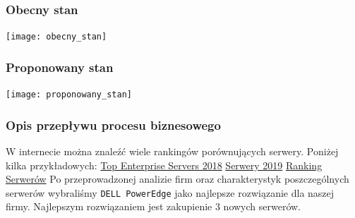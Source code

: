 \documentclass[a4paper, 12pt]{article}
\begin{document}
				\subsubsection{Obecny stan}
			  \texttt{[image: obecny\_stan]}
			  
			  	\subsubsection{Proponowany stan}
			  	\texttt{[image: proponowany\_stan]} \newline
			  	\subsubsection{Opis przepływu procesu biznesowego}
			  	\hspace*{1cm} W internecie można znaleźć wiele rankingów porównujących serwery. Poniżej kilka przykładowych: \newline
				\href{https://www.crn.com/slide-shows/data-center/300106536/the-10-top-enterprise-servers-of-2018-so-far.htm/1} {Top Enterprise Servers 2018} \newline
				\href{https://www.techradar.com/news/best-small-business-servers} {Serwery 2019}\newline
				\href{https://www.skapiec.pl/cat/93-serwery/ranking.html} {Ranking Serwerów}\newline
				\hspace*{1cm}Po przeprowadzonej analizie firm oraz charakterystyk poszczególnych serwerów wybraliśmy \texttt{DELL PowerEdge} jako najlepsze rozwiązanie dla naszej firmy. Najlepszym rozwiązaniem jest zakupienie 3 nowych serwerów.
				
\end{document}
